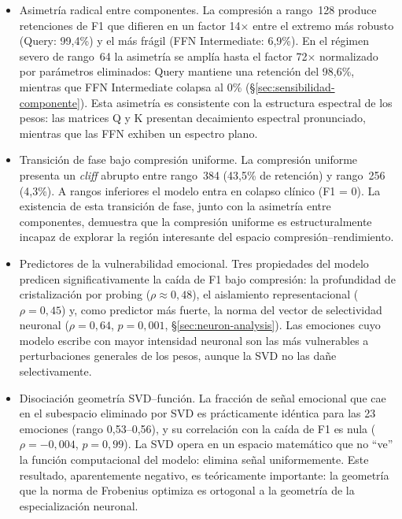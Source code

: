 \begin{itemize}
  \item Asimetría radical entre componentes. La compresión a
        rango~128 produce retenciones de F1 que difieren en un factor 14$\times$
        entre el extremo más robusto (Query: 99{,}4\%) y el más frágil (FFN
        Intermediate: 6{,}9\%). En el régimen severo de rango~64 la asimetría
        se amplía hasta el factor 72$\times$ normalizado por parámetros
        eliminados: Query mantiene una retención del 98{,}6\%, mientras que
        FFN Intermediate colapsa al 0\% (\S\ref{sec:sensibilidad-componente}). Esta asimetría es consistente
        con la estructura espectral de los pesos: las matrices Q y K presentan
        decaimiento espectral pronunciado, mientras que las FFN exhiben un
        espectro plano.

  \item Transición de fase bajo compresión uniforme. La compresión
        uniforme presenta un \emph{cliff} abrupto entre rango~384 (43{,}5\%
        de retención) y rango~256 (4{,}3\%). A rangos inferiores el modelo
        entra en colapso clínico (F1 = 0). La existencia de esta transición
        de fase, junto con la asimetría entre componentes, demuestra que la
        compresión uniforme es estructuralmente incapaz de explorar la
        región interesante del espacio compresión--rendimiento.

  \item Predictores de la vulnerabilidad emocional. Tres
        propiedades del modelo predicen significativamente la caída de F1
        bajo compresión: la profundidad de cristalización por probing
        ($\rho \approx 0{,}48$), el aislamiento representacional
        ($\rho = 0{,}45$) y, como predictor más fuerte, la norma del
        vector de selectividad neuronal ($\rho = 0{,}64$, $p = 0{,}001$,
        \S\ref{sec:neuron-analysis}). Las emociones cuyo modelo escribe con
        mayor intensidad neuronal son las más vulnerables a perturbaciones
        generales de los pesos, aunque la SVD no las dañe selectivamente.

  \item Disociación geometría SVD--función. La fracción de señal
        emocional que cae en el subespacio eliminado por SVD es
        prácticamente idéntica para las 23 emociones (rango 0{,}53--0{,}56),
        y su correlación con la caída de F1 es nula
        ($\rho = -0{,}004$, $p = 0{,}99$). La SVD opera en un espacio
        matemático que no ``ve'' la función computacional del modelo: elimina
        señal uniformemente. Este resultado, aparentemente negativo, es
        teóricamente importante: la geometría que la norma de Frobenius
        optimiza es ortogonal a la geometría de la especialización
        neuronal.
\end{itemize}


